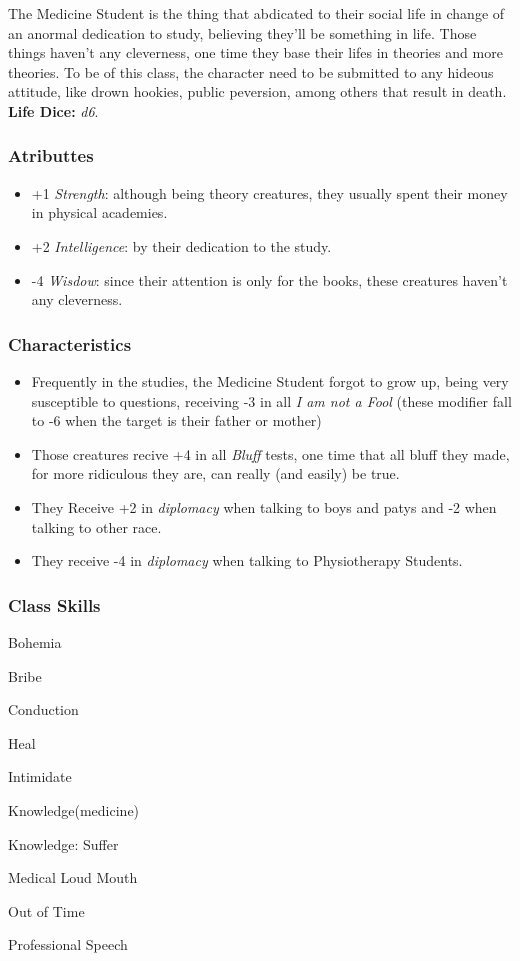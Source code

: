 \documentclass[ letterpaper,12pt]{article}
\begin{document}
The Medicine Student is the thing that abdicated to their social life in change of an anormal dedication to study, believing they'll be something in life. Those things haven't any cleverness, one time they base their lifes in theories and more theories. To be of this class, the character need to be submitted to any hideous attitude, like drown hookies, public peversion, among others that result in death.\\

{\bf Life Dice:} {\it d6}.

\subsubsection{Atributtes}
\begin{itemize}
\item{+1 {\it Strength}: although  being  theory  creatures,  they usually  spent  their  money  in physical academies.}
\item{+2 {\it Intelligence}: by  their  dedication  to  the  study.}
\item{-4 {\it Wisdow}: since their attention is only for the books, these  creatures  haven't any cleverness.}
\end{itemize}

\subsubsection{Characteristics}
\begin{itemize}
\item{Frequently in the studies, the Medicine Student forgot to grow up, being very susceptible to questions, receiving -3 in all {\it I am not a Fool} (these modifier fall to -6 when the target is their father  or mother)}
\item{Those creatures recive  +4 in  all  {\it Bluff} tests, one time that all bluff they made, for more ridiculous they are, can  really (and easily) be true.}
\item{They Receive +2 in {\it diplomacy} when talking to boys and patys and -2 when talking to other race.}
\item{They receive -4 in {\it diplomacy} when talking to Physiotherapy Students.}
\end{itemize}

\subsubsection{Class Skills}
\begin{itemize}
{\it
\item{Bohemia}
\item{Bribe}
\item{Conduction}
\item{Heal}
\item{Intimidate}
\item{Knowledge(medicine)}
\item{Knowledge: Suffer}
\item{Medical Loud Mouth}
\item{Out of Time}
\item{Professional Speech}
}
\end{itemize}
\end{document}
